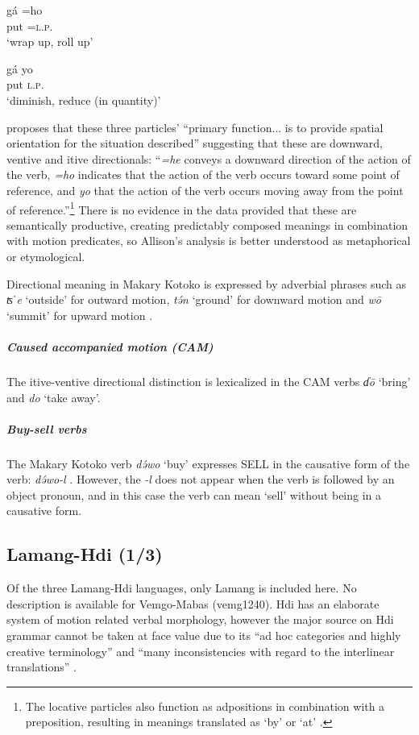 \ex
\gll gá =ho	\\ 
put =\textsc{l.p.}	\\
\glt `wrap up, roll up'

\ex 
\gll gá yo	\\
put \textsc{l.p.}	\\
\glt `diminish, reduce (in quantity)'
\z
\z 

\citet[239]{allisonGrammarMakaryKotoko2020} proposes that these three particles' ``primary function... is to provide spatial orientation for the situation described'' suggesting that these are downward, ventive and itive directionals: ``\textit{=he} conveys a downward direction of the action of the verb, \textit{=ho} indicates that the action of the verb occurs toward some point of reference, and \textit{yo} that the action of the verb occurs moving away from the point of reference.''\footnote{The locative particles also function as adpositions in combination with a preposition, resulting in meanings translated as ‘by’ or ‘at’ \citep[171]{allisonGrammarMakaryKotoko2020}.} There is no evidence in the data provided that these are semantically productive, creating predictably composed meanings in combination with motion predicates, so Allison’s analysis is better understood as metaphorical or etymological. 

Directional meaning in Makary Kotoko is expressed by adverbial phrases such as \textit{ʦˈe} `outside' for outward motion, \textit{tə́n} `ground' for downward motion and \textit{wō} `summit' for upward motion \citep[208, 235]{allisonGrammarMakaryKotoko2020}.

\subparagraph{Caused accompanied motion (CAM)}

The itive-ventive directional distinction is lexicalized in the CAM verbs \textit{ɗō} `bring' and \textit{do} `take away'. 

\subparagraph{Buy-sell verbs}

The Makary Kotoko verb \textit{də́wo} `buy' expresses SELL in the causative form of the verb: \textit{də́wo-l} \citep[222--223]{allisonGrammarMakaryKotoko2020}. However, the \textit{-l} does not appear when the verb is followed by an object pronoun, and in this case the verb can mean `sell' without being in a causative form. 

\subsection{Lamang-Hdi (1/3)} 

Of the three Lamang-Hdi languages, only Lamang is included here.  No description is available for Vemgo-Mabas (vemg1240). Hdi has an elaborate system of motion related verbal morphology, however the major source on Hdi grammar \citep{frajzyngierGrammarHdi2002} cannot be taken at face value due to its ``ad hoc categories and highly creative terminology'' and ``many inconsistencies with regard to the interlinear translations''  \citep[215]{wolffLanguageVariationTheoretical2011}. 

